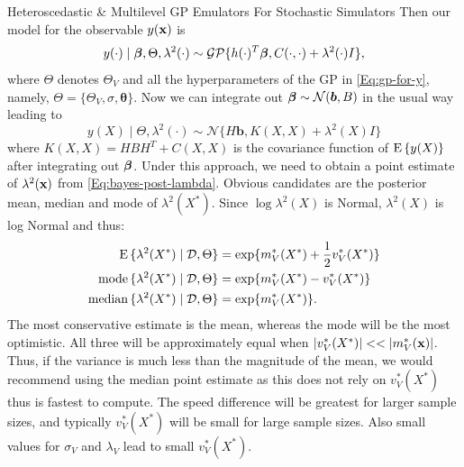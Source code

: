 \begin{chapter}{Heteroscedastic \& Multilevel GP Emulators For Stochastic Simulators\label{Ch:Hetsml}}
Then our model for the observable $y(\mathbf{x})$ is
\begin{equation}
	y(\cdot) \mid \bm{\beta}, \Theta, \lambda^2(\cdot) \sim \mathcal{GP} \{ h(\cdot)^T \bm{\beta}, C(\cdot, \cdot) + \lambda^2(\cdot)I \}, \label{Eq:gp-for-y}
\end{equation}
where $\Theta$ denotes $\Theta_V$ and all the hyperparameters of the GP in \cref{Eq:gp-for-y}, namely, $\Theta = \{\Theta_V, \sigma, \bm{\theta} \}$. Now we can integrate out $\bm{\beta} \sim \mathcal{N}(\bm{b}, B)$ in the usual way leading to
\begin{equation}
	y(X) \mid \Theta, \lambda^2(\cdot) \sim \mathcal{N} \{ H\bm{b}, K(X, X) + \lambda^2(X)I \}
\end{equation}
where $K(X, X) = HBH^T + C(X, X)$ is the covariance function of $\textrm{E}\, \{y(X)\}$ after integrating out $\bm{\beta}$. Under this approach, we need to obtain a point estimate of $\lambda^2(\mathbf{x})$ from \cref{Eq:bayes-post-lambda}. Obvious candidates are the posterior mean, median and mode of $\lambda^2(X^*)$. Since $\log \lambda^2(X)$ is Normal, $\lambda^2(X)$ is log Normal and thus:
\begin{align}
	\textrm{E}\, \{\lambda^2(X^*) \mid \mathcal{D}, \Theta \} &= \exp \{ m_V^*(X^*) + \frac{1}{2}v_V^*(X^*) \}\\
	\text{mode}\, \{\lambda^2(X^*) \mid \mathcal{D}, \Theta \} &= \exp \{ m_V^*(X^*) - v_V^*(X^*) \}\\
	\text{median}\, \{\lambda^2(X^*) \mid \mathcal{D}, \Theta \} &= \exp \{ m_V^*(X^*)\}.
\end{align}
 The most conservative estimate is the mean, whereas the mode will be the most optimistic. All three will be approximately equal when $|v_V^*(X^*)|<<|m^*_V(\bx)|$. Thus, if the variance is much less than the magnitude of the mean, we would recommend using the median point estimate as this does not rely on $v_V^*(X^*)$ thus is fastest to compute. The speed difference will be greatest for larger sample sizes, and typically $v_V^*(X^*)$ will be small for large sample sizes. Also small values for $\sigma_V$ and $\lambda_V$ lead to small $v_V^*(X^*)$.

\end{chapter}
